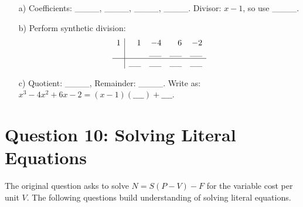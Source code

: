 \documentclass[12pt]{article}
\begin{document}
\begin{enumerate}[label=9.\arabic*]
\begin{enumerate}
        \item[a)] Coefficients: \_\_\_\_, \_\_\_\_, \_\_\_\_, \_\_\_\_. Divisor: \( x - 1 \), so use \_\_\_\_.
        \item[b)] Perform synthetic division: \\
        \[
        \begin{array}{r|rrrr}
        1 & 1 & -4 & 6 & -2 \\
          &   & \_\_ & \_\_ & \_\_ \\
        \hline
          & \_\_ & \_\_ & \_\_ & \_\_ \\
        \end{array}
        \]
        \item[c)] Quotient: \_\_\_\_, Remainder: \_\_\_\_. Write as: \( x^3 - 4x^2 + 6x - 2 = (x - 1)(\_\_\_\_) + \_\_\_\_ \).
    \end{enumerate}
\end{enumerate}

\section*{Question 10: Solving Literal Equations}
The original question asks to solve \( N = S(P - V) - F \) for the variable cost per unit \( V \). The following questions build understanding of solving literal equations.
\end{document}
